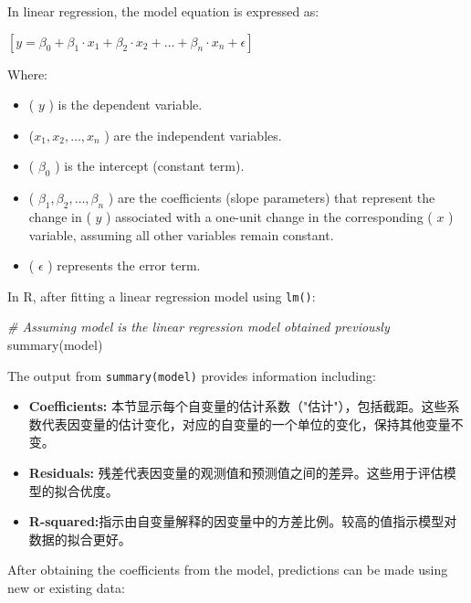 \documentclass[
]{article}
\newenvironment{Shaded}{}{}
\newcommand{\CommentTok}[1]{\textcolor[rgb]{0.38,0.63,0.69}{\textit{#1}}}
\newcommand{\FunctionTok}[1]{\textcolor[rgb]{0.02,0.16,0.49}{#1}}
\newcommand{\NormalTok}[1]{#1}
\begin{document}
In linear regression, the model equation is expressed as:

\begin{center}
	\([ y = \beta_0 + \beta_1 \cdot x_1 + \beta_2 \cdot x_2 + \ldots + \beta_n \cdot x_n + \epsilon ]\)
\end{center}


Where:

\begin{itemize}
\item
  ( \(y\) ) is the dependent variable.
\item
  (\( x_1, x_2, \ldots, x_n\) ) are the independent variables.
\item
  ( \( \beta_0\) ) is the intercept (constant term).
\item
  ( \( \beta_1, \beta_2, \ldots, \beta_n \) ) are the coefficients (slope
  parameters) that represent the change in ( \(  y  \) ) associated with a
  one-unit change in the corresponding ( \(  x  \) ) variable, assuming all
  other variables remain constant.
\item
  ( \(  \epsilon  \) ) represents the error term.
\end{itemize}

In R, after fitting a linear regression model using \texttt{lm()}:

\begin{Shaded}
\begin{Highlighting}[]
\CommentTok{\# Assuming \textquotesingle{}model\textquotesingle{} is the linear regression model obtained previously}
\FunctionTok{summary}\NormalTok{(model)}
\end{Highlighting}
\end{Shaded}

The output from \texttt{summary(model)} provides information including:

\begin{itemize}
\item
  \textbf{Coefficients:}
  本节显示每个自变量的估计系数（"估计"），包括截距。这些系数代表因变量的估计变化，对应的自变量的一个单位的变化，保持其他变量不变。
\item
  \textbf{Residuals:}
  残差代表因变量的观测值和预测值之间的差异。这些用于评估模型的拟合优度。
\item
  \textbf{R-squared:}指示由自变量解释的因变量中的方差比例。较高的值指示模型对数据的拟合更好。
\end{itemize}

After obtaining the coefficients from the model, predictions can be made
using new or existing data:
\end{document}
